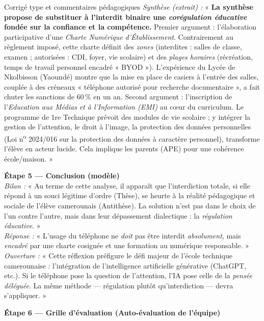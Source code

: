 \documentclass[11pt]{article}
\begin{document}
\begin{exoresolu}{Corrigé type et commentaires pédagogiques}
\textit{Synthèse (extrait) :} « \textbf{La synthèse propose de substituer à l'interdit binaire une \emph{corégulation éducative} fondée sur la confiance et la compétence.} Premier argument : l'élaboration participative d'une \emph{Charte Numérique d'Établissement}. Contrairement au règlement imposé, cette charte définit des \emph{zones} (interdites : salles de classe, examen ; autorisées : CDI, foyer, vie scolaire) et des \emph{plages horaires} (récréation, temps de travail personnel encadré « BYOD »). L'expérience du Lycée de Nkolbisson (Yaoundé) montre que la mise en place de casiers à l'entrée des salles, couplée à des créneaux « téléphone autorisé pour recherche documentaire », a fait chuter les sanctions de 60\,\% en un an. Second argument : l'inscription de l'\emph{Education aux Médias et à l'Information (EMI)} au cœur du curriculum. Le programme de 1re Technique prévoit des modules de vie scolaire ; y intégrer la gestion de l'attention, le droit à l'image, la protection des données personnelles (Loi n\textsuperscript{o} 2024/016 sur la protection des données à caractère personnel), transforme l'élève en acteur lucide. Cela implique les parents (APE) pour une cohérence école/maison. »

\textbf{Étape 5 — Conclusion (modèle)}\\
\textit{Bilan :} « Au terme de cette analyse, il apparaît que l'interdiction totale, si elle répond à un souci légitime d'ordre (Thèse), se heurte à la réalité pédagogique et sociale de l'élève camerounais (Antithèse). La solution n'est pas dans le choix de l'un contre l'autre, mais dans leur dépassement dialectique : la \emph{régulation éducative}. »\\
\textit{Réponse :} « L'usage du téléphone ne \emph{doit} pas être interdit \emph{absolument}, mais \emph{encadré} par une charte cosignée et une formation au numérique responsable. »\\
\textit{Ouverture :} « Cette réflexion préfigure le défi majeur de l'école technique camerounaise : l'intégration de l'intelligence artificielle générative (ChatGPT, etc.). Si le téléphone pose la question de l'attention, l'IA pose celle de la \emph{pensée déléguée}. La même méthode — régulation plutôt qu'interdiction — devra s'appliquer. »

\textbf{Étape 6 — Grille d'évaluation (Auto-évaluation de l'équipe)}


\end{exoresolu}
\end{document}
